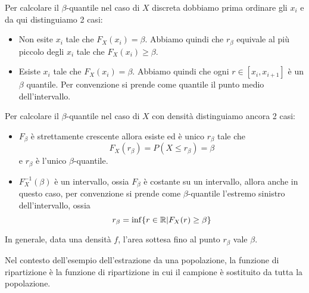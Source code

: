 Per calcolare il $\beta$-quantile nel caso di $X$ discreta dobbiamo prima ordinare gli $x_i$ e da
qui distinguiamo 2 casi:
\begin{itemize}
	\item Non esite $x_i$ tale che $F_X(x_i) = \beta$. Abbiamo quindi che $r_\beta$ equivale al più
	      piccolo degli $x_i$ tale che $F_X(x_i) \geq \beta$.
	\item Esiste $x_i$ tale che $F_X(x_i) = \beta$. Abbiamo quindi che ogni $r \in [x_i, x_{i+1}]$
	      è un $\beta$ quantile. Per convenzione si prende come quantile il punto medio
	      dell'intervallo.
\end{itemize}
Per calcolare il $\beta$-quantile nel caso di $X$ con densità distinguiamo ancora 2 casi:
\begin{itemize}
	\item $F_\beta$ è strettamente crescente allora esiste ed è unico $r_\beta$ tale che
	      \[ F_X(r_\beta) = P(X \leq r_\beta) = \beta \]
	      e $r_\beta$ è l'unico $\beta$-quantile.
	\item $F_X^{-1} (\beta)$ è un intervallo, ossia $F_\beta$ è costante su un intervallo, allora
	      anche in questo caso, per convenzione si prende come $\beta$-quantile l'estremo sinistro
	      dell'intervallo, ossia
	      \[ r_\beta = \inf \{ r \in \mathbb{R} | F_X(r) \geq \beta \} \]
\end{itemize}
In generale, data una densità $f$, l'area sottesa fino al punto $r_\beta$ vale $\beta$.

\begin{observation}
	Nel contesto dell'esempio dell'estrazione da una popolazione, la funzione di ripartizione è la
	funzione di ripartizione in cui il campione è sostituito da tutta la popolazione.
\end{observation}